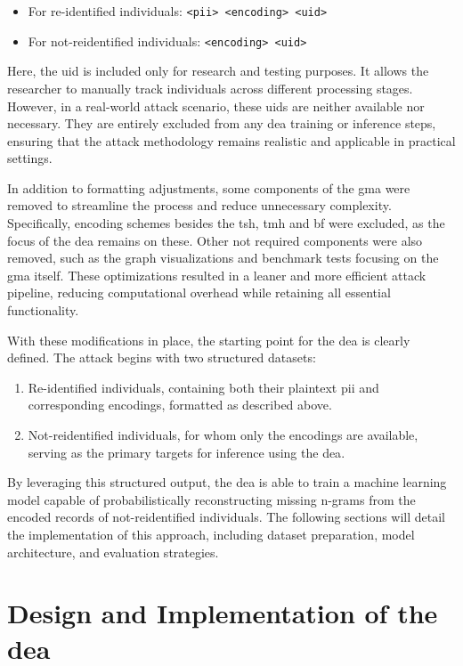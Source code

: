 \begin{itemize}
    \item For re-identified individuals: \texttt{<\ac{pii}> <encoding> <uid>}
    \item For not-reidentified individuals: \texttt{<encoding> <uid>}
\end{itemize}

Here, the uid is included only for research and testing purposes.
It allows the researcher to manually track individuals across different processing stages.
However, in a real-world attack scenario, these uids are neither available nor necessary.
They are entirely excluded from any \ac{dea} training or inference steps, ensuring that the attack methodology remains realistic and applicable in practical settings.

In addition to formatting adjustments, some components of the \ac{gma} were removed to streamline the process and reduce unnecessary complexity.
Specifically, encoding schemes besides the \ac{tsh}, \ac{tmh} and \ac{bf} were excluded, as the focus of the \ac{dea} remains on these.
Other not required components were also removed, such as the graph visualizations and benchmark tests focusing on the \ac{gma} itself.
These optimizations resulted in a leaner and more efficient attack pipeline, reducing computational overhead while retaining all essential functionality.

With these modifications in place, the starting point for the \ac{dea} is clearly defined.
The attack begins with two structured datasets:

\begin{enumerate}
    \item Re-identified individuals, containing both their plaintext \ac{pii} and corresponding encodings, formatted as described above.
    \item Not-reidentified individuals, for whom only the encodings are available, serving as the primary targets for inference using the \ac{dea}.
\end{enumerate}

By leveraging this structured output, the \ac{dea} is able to train a machine learning model capable of probabilistically reconstructing missing n-grams from the encoded records of not-reidentified individuals.
The following sections will detail the implementation of this approach, including dataset preparation, model architecture, and evaluation strategies.

\section{Design and Implementation of the \ac{dea}} \label{sec:designandimplementation}

